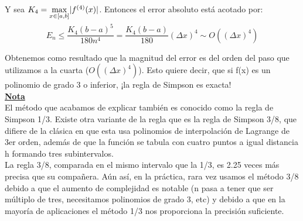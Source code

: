 \documentclass{article}
\begin{document}
			Y sea $K_4 = \smash{\displaystyle\max_{x \in [a,b]}} |f^{(4)}(x)|$. Entonces el error absoluto está acotado por:
			
			
			\begin{equation}
				E_n \leq \frac{K_4(b-a)^5}{180n^4} = \frac{K_4(b-a)}{180}(\Delta x)^4 \sim O((\Delta x)^4)
			\end{equation}
			
			Obtenemos como resultado que la magnitud del error es del orden del paso que utilizamos a la cuarta ($O((\Delta x)^4)$). Esto quiere decir, que si f(x) es un polinomio de grado 3 o inferior, ¡la regla de Simpson es exacta!\\
			
			\underline{\textbf{Nota}} \\
			
			El método que acabamos de explicar también es conocido como la regla de Simpson 1/3. Existe otra variante de la regla que es la regla de Simpson 3/8, que difiere de la clásica en que esta usa polinomios de interpolación de Lagrange de 3er orden, además de que la función se tabula con cuatro puntos a igual distancia h formando tres subintervalos. \\
			
			La regla 3/8, comparada en el mismo intervalo que la 1/3, es 2.25 veces más precisa que su compañera. Aún así, en la práctica, rara vez usamos el método 3/8 debido a que el aumento de complejidad es notable (n pasa a tener que ser múltiplo de tres, necesitamos polinomios de grado 3, etc) y debido a que en la mayoría de aplicaciones el método 1/3 nos proporciona la precisión suficiente.\\ 
	
	
	
	
	
	
	
	
	
	
	
	
	
	
	
	
	
	
	
	
	
	
	
	
	
	
	
	
	
	
	
	
	
	
	
	
	
	
	
	
	
	
	
	
	
	
	
	
	
	
	
	
	
	
	
	
	
	
	
	
	
	
	
	
	
	
	
	
	
	
	
	
	
\end{document}
